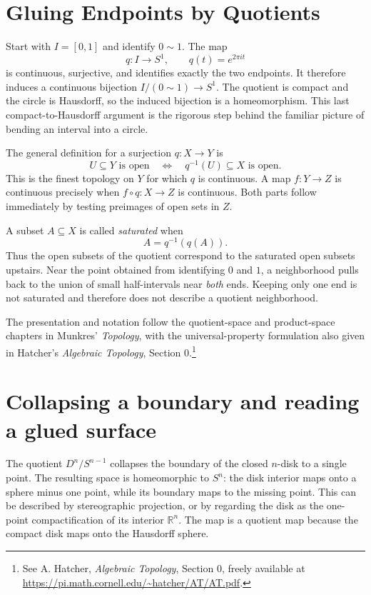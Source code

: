 
\section{Gluing Endpoints by Quotients}

Start with \(I=[0,1]\) and identify \(0\sim1\). The map
\[
 q:I\longrightarrow S^1,\qquad q(t)=e^{2\pi it}
\]
is continuous, surjective, and identifies exactly the two endpoints. It therefore induces a continuous bijection \(I/(0\sim1)\to S^1\). The quotient is compact and the circle is Hausdorff, so the induced bijection is a homeomorphism. This last compact-to-Hausdorff argument is the rigorous step behind the familiar picture of bending an interval into a circle.

The general definition for a surjection \(q:X\to Y\) is
\[
 U\subseteq Y\text{ is open}
 \quad\Longleftrightarrow\quad
 q^{-1}(U)\subseteq X\text{ is open}.
\]
This is the finest topology on \(Y\) for which \(q\) is continuous. A map \(f:Y\to Z\) is continuous precisely when \(f\circ q:X\to Z\) is continuous. Both parts follow immediately by testing preimages of open sets in \(Z\).

A subset \(A\subseteq X\) is called \emph{saturated} when
\[
 A=q^{-1}(q(A)).
\]
Thus the open subsets of the quotient correspond to the saturated open subsets upstairs. Near the point obtained from identifying \(0\) and \(1\), a neighborhood pulls back to the union of small half-intervals near \emph{both} ends. Keeping only one end is not saturated and therefore does not describe a quotient neighborhood.

The presentation and notation follow the quotient-space and product-space chapters in Munkres' \emph{Topology}, with the universal-property formulation also given in Hatcher's \emph{Algebraic Topology}, Section 0.\footnote{See A. Hatcher, \emph{Algebraic Topology}, Section 0, freely available at \url{https://pi.math.cornell.edu/~hatcher/AT/AT.pdf}.}

\section{Collapsing a boundary and reading a glued surface}

The quotient \(D^n/S^{n-1}\) collapses the boundary of the closed \(n\)-disk to a single point. The resulting space is homeomorphic to \(S^n\): the disk interior maps onto a sphere minus one point, while its boundary maps to the missing point. This can be described by stereographic projection, or by regarding the disk as the one-point compactification of its interior \(\mathbb R^n\). The map is a quotient map because the compact disk maps onto the Hausdorff sphere.

